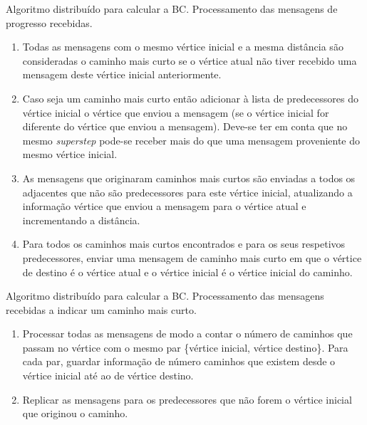 \begin{algorithm}
  \caption{Algoritmo distribuído para calcular a BC. Processamento das 
mensagens de progresso recebidas.}
  \label{alg:msgprogbc}
  \begin{enumerate}
		\item Todas as mensagens com o mesmo vértice inicial e a mesma distância são consideradas o caminho mais curto se o vértice atual não tiver recebido uma mensagem deste vértice inicial anteriormente.
    \item Caso seja um caminho mais curto então adicionar à lista de 
predecessores do vértice inicial o vértice que enviou a mensagem (se o 
vértice inicial for diferente do vértice que enviou a mensagem). Deve-se 
ter em conta que no mesmo \textit{superstep} pode-se receber mais do que uma 
mensagem proveniente do mesmo vértice inicial.
    \item As mensagens que originaram caminhos mais curtos são enviadas a todos os adjacentes que não são predecessores para este vértice inicial,  atualizando a informação vértice que enviou a mensagem para o vértice atual e incrementando a distância.
    \item Para todos os caminhos mais curtos encontrados e para os 
seus respetivos predecessores, enviar uma mensagem de caminho mais curto em que o vértice de destino é o vértice atual e o vértice inicial é o vértice inicial do caminho.
  \end{enumerate}
\end{algorithm}

\begin{algorithm}
  \caption{Algoritmo distribuído para calcular a BC. Processamento das 
mensagens recebidas a indicar um caminho mais curto.}
  \label{alg:msgpathbc}
  \begin{enumerate}  
     \item Processar todas as mensagens de modo a contar o número de 
caminhos que passam no vértice com o mesmo par \{vértice inicial, vértice destino\}. 
Para cada par, guardar informação de número caminhos que existem desde o 
vértice inicial até ao de vértice destino.
     \item Replicar as mensagens para os predecessores que não forem o vértice inicial que originou o caminho.
  \end{enumerate}
\end{algorithm}

